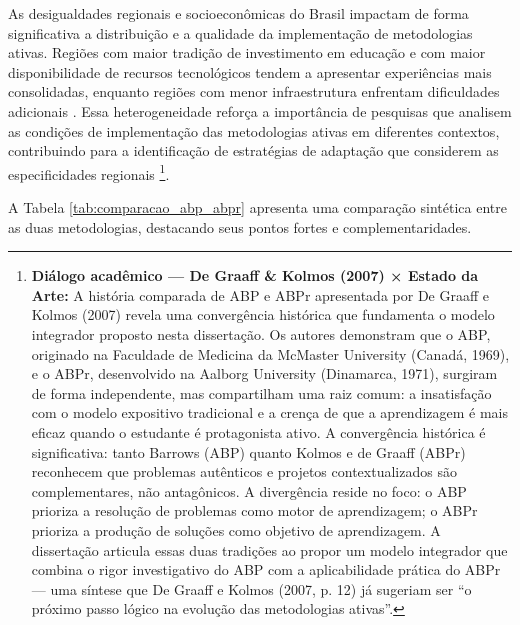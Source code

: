 As desigualdades regionais e socioeconômicas do Brasil impactam de forma significativa a distribuição e a qualidade da implementação de metodologias ativas. Regiões com maior tradição de investimento em educação e com maior disponibilidade de recursos tecnológicos tendem a apresentar experiências mais consolidadas, enquanto regiões com menor infraestrutura enfrentam dificuldades adicionais \cite{GUSMAO2022}. Essa heterogeneidade reforça a importância de pesquisas que analisem as condições de implementação das metodologias ativas em diferentes contextos, contribuindo para a identificação de estratégias de adaptação que considerem as especificidades regionais \cite{SILVA2023, DEGRAAFF2007}\footnote{\textbf{Diálogo acadêmico — De Graaff \& Kolmos (2007) × Estado da Arte:} A história comparada de ABP e ABPr apresentada por De Graaff e Kolmos (2007) revela uma convergência histórica que fundamenta o modelo integrador proposto nesta dissertação. Os autores demonstram que o ABP, originado na Faculdade de Medicina da McMaster University (Canadá, 1969), e o ABPr, desenvolvido na Aalborg University (Dinamarca, 1971), surgiram de forma independente, mas compartilham uma raiz comum: a insatisfação com o modelo expositivo tradicional e a crença de que a aprendizagem é mais eficaz quando o estudante é protagonista ativo. A convergência histórica é significativa: tanto Barrows (ABP) quanto Kolmos e de Graaff (ABPr) reconhecem que problemas autênticos e projetos contextualizados são complementares, não antagônicos. A divergência reside no foco: o ABP prioriza a resolução de problemas como motor de aprendizagem; o ABPr prioriza a produção de soluções como objetivo de aprendizagem. A dissertação articula essas duas tradições ao propor um modelo integrador que combina o rigor investigativo do ABP com a aplicabilidade prática do ABPr — uma síntese que De Graaff e Kolmos (2007, p. 12) já sugeriam ser ``o próximo passo lógico na evolução das metodologias ativas''.}.

A Tabela \ref{tab:comparacao_abp_abpr} apresenta uma comparação sintética entre as duas metodologias, destacando seus pontos fortes e complementaridades.

